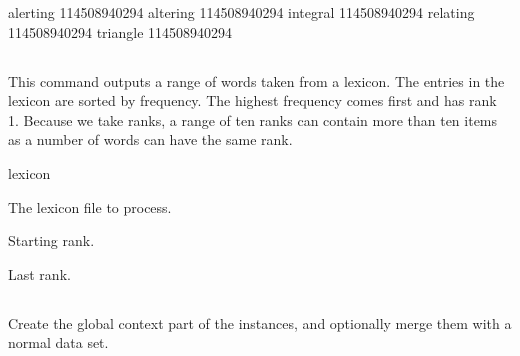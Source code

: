 \documentclass[a4paper,10pt,twoside]{report}
\begin{document}
\begin{wout}{}
alerting 114508940294
altering 114508940294
integral 114508940294
relating 114508940294
triangle 114508940294
\end{wout}

\subsection{}

This command outputs a range of words taken from a lexicon. The
entries in the lexicon are sorted by frequency. The highest frequency
comes first and has rank 1.  Because we take ranks, a range of ten
ranks can contain more than ten items as a number of words can have
the same rank.

\begin{varlist}{lexicon}
\item[lexicon] The lexicon file to process.
\item[n] Starting rank.
\item[m] Last rank.
\end{varlist}

\subsection{}

Create the global context part of the instances, and optionally merge
them with a normal data set.
\end{document}
